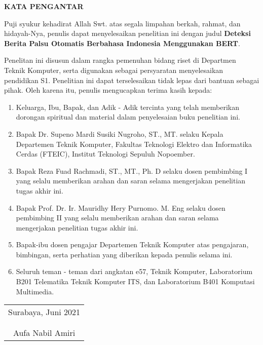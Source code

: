 \begin{center}
  \Large \textbf{KATA PENGANTAR}
\end{center}


Puji syukur kehadirat Allah Swt. atas segala limpahan berkah, rahmat, dan hidayah-Nya, penulis dapat menyelesaikan penelitian ini dengan judul \textbf{Deteksi Berita Palsu Otomatis Berbahasa Indonesia Menggunakan BERT}.

Penelitan ini disusun dalam rangka pemenuhan bidang riset di Departmen Teknik Komputer, serta digunakan sebagai persyaratan menyelesaikan pendidikan S1. Penelitian ini dapat terselesaikan tidak lepas dari bantuan sebagai pihak. Oleh karena itu, penulis mengucapkan terima kasih kepada:

\begin{enumerate}[nolistsep]
  \item Keluarga, Ibu, Bapak, dan Adik - Adik tercinta yang telah memberikan dorongan spiritual dan material dalam penyelesaian buku penelitian ini.
  \item Bapak Dr. Supeno Mardi Susiki Nugroho, ST., MT. selaku Kepala Departemen Teknik Komputer, Fakultas Teknologi Elektro dan Informatika Cerdas (FTEIC), Institut Teknologi Sepuluh Nopoember.
  \item Bapak Reza Fuad Rachmadi, ST., MT., Ph. D selaku dosen pembimbing I yang selalu memberikan arahan dan saran selama mengerjakan penelitian tugas akhir ini.
  \item Bapak Prof. Dr. Ir. Mauridhy Hery Purnomo. M. Eng selaku dosen pembimbing II yang selalu memberikan arahan dan saran selama mengerjakan penelitian tugas akhir ini.
  \item Bapak-ibu dosen pengajar Departemen Teknik Komputer atas pengajaran, bimbingan, serta perhatian yang diberikan kepada penulis selama ini.
  \item Seluruh teman - teman dari angkatan e57, Teknik Komputer, Laboratorium B201 Telematika Teknik Komputer ITS, dan Laboratorium B401 Komputasi Multimedia.

\end{enumerate}

\begin{flushright}
  \begin{tabular}[b]{c}
    Surabaya, Juni 2021 \\
    \\
    \\
    Aufa Nabil Amiri
  \end{tabular}
\end{flushright}
